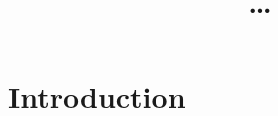 \documentclass[11pt,letterpaper]{article}
\title{\ldots}
\date{}
\begin{document}
\def\emnlp/{\textit{KS2013}}
\def\PhraseRel/{PhraseRel}

\def\PMI/{$1 \operatorname{PMI}$}
\def\SPMI/{$1 \operatorname{SPMI}$}
\def\CPMI/{$1 \operatorname{CPMI}$}
\def\SCPMI/{$1 \operatorname{SCPMI}$}

\def\NPMI/{$n \operatorname{PMI}$}
\def\NSPMI/{$n \operatorname{SPMI}$}
\def\NCPMI/{$n \operatorname{CPMI}$}
\def\NSCPMI/{$n \operatorname{SCPMI}$}

\def\logNPMI/{$\log n\operatorname{PMI}$}
\def\logNSPMI/{$\log n\operatorname{SPMI}$}
\def\logNCPMI/{$\log n \operatorname{CPMI}$}
\def\logNSCPMI/{$\log n \operatorname{SCPMI}$}


\maketitle
\begin{abstract}

\end{abstract}

\section{Introduction}
\label{sec:introduction}


\end{document}
